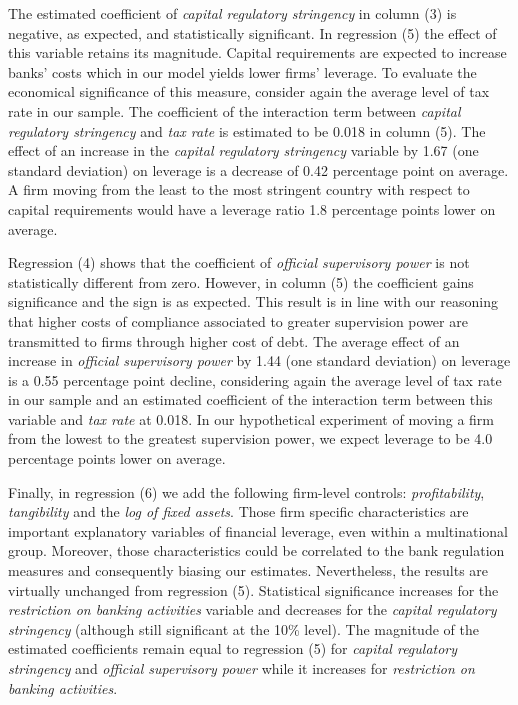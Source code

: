 \documentclass[12pt]{article}
\begin{document}
	  The estimated coefficient of \textit{capital regulatory stringency} in column (3) is negative, as expected, and statistically significant. In regression (5) the effect of this variable retains its magnitude. Capital requirements are expected to increase banks' costs which in our model yields lower firms' leverage. To evaluate the economical significance of this measure, consider again the average level of tax rate in our sample. The coefficient of the interaction term between \textit{capital regulatory stringency} and \textit{tax rate} is estimated to be 0.018 in column (5). The effect of an increase in the \textit{capital regulatory stringency} variable by 1.67 (one standard deviation) on leverage is a decrease of 0.42 percentage point on average. A firm moving from the least to the most stringent country with respect to capital requirements would have a leverage ratio 1.8 percentage points lower on average.
	
	  Regression (4) shows that the coefficient of \textit{official supervisory power} is not statistically different from zero. However, in column (5) the coefficient gains significance and the sign is as expected. This result is in line with our reasoning that higher costs of compliance associated to greater supervision power are transmitted to firms through higher cost of debt. The average effect of an increase in \textit{official supervisory power} by 1.44 (one standard deviation) on leverage is a 0.55 percentage point decline, considering again the average level of tax rate in our sample and an estimated coefficient of the interaction term between this variable and \textit{tax rate} at 0.018. In our hypothetical experiment of moving a firm from the lowest to the greatest supervision power, we expect leverage to be 4.0 percentage points lower on average.
	
	  Finally, in regression (6) we add the following firm-level controls: \textit{profitability}, \textit{tangibility} and the \textit{log of fixed assets}. Those firm specific characteristics are important explanatory variables of financial leverage, even within a multinational group. Moreover, those characteristics could be correlated to the bank regulation measures and consequently biasing our estimates. Nevertheless, the results are virtually unchanged from regression (5). Statistical significance increases for the \textit{restriction on banking activities} variable and decreases for the \textit{capital regulatory stringency} (although still significant at the 10\% level). The magnitude of the estimated coefficients remain equal to regression (5) for \textit{capital regulatory stringency} and \textit{official supervisory power} while it increases for \textit{restriction on banking activities}.
	   	    			   		
\end{document}
